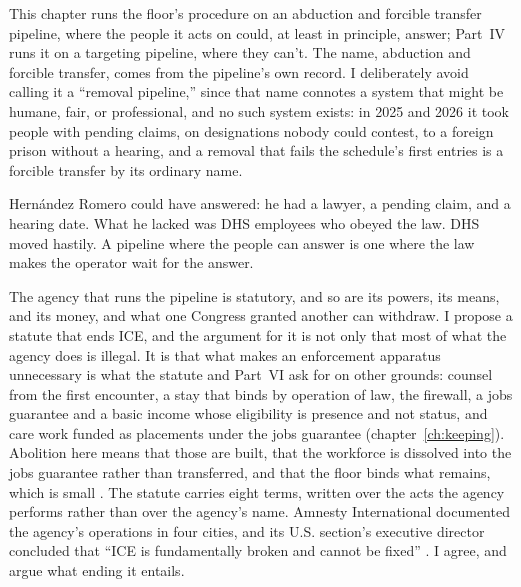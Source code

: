 This chapter runs the floor's procedure on an abduction and forcible transfer pipeline, where the people it acts on could, at least in principle, answer; Part~IV runs it on a targeting pipeline, where they can't. The name, abduction and forcible transfer, comes from the pipeline's own record. I deliberately avoid calling it a “removal pipeline,” since that name connotes a system that might be humane, fair, or professional, and no such system exists: in 2025 and 2026 it took people with pending claims, on designations nobody could contest, to a foreign prison without a hearing, and a removal that fails the schedule's first entries is a forcible transfer by its ordinary name.

Hernández Romero could have answered: he had a lawyer, a pending claim, and a hearing date. What he lacked was DHS employees who obeyed the law. DHS moved hastily.
A pipeline where the people can answer is one where the law makes the operator wait for the answer.

The agency that runs the pipeline is statutory, and so are its powers, its means, and its money, and what one Congress granted another can withdraw. I propose a statute that ends ICE, and the argument for it is not only that most of what the agency does is illegal. It is that what makes an enforcement apparatus unnecessary is what the statute and Part~VI ask for on other grounds: counsel from the first encounter, a stay that binds by operation of law, the firewall, a jobs guarantee and a basic income whose eligibility is presence and not status, and care work funded as placements under the jobs guarantee (chapter~\ref{ch:keeping}). Abolition here means that those are built, that the workforce is dissolved into the jobs guarantee rather than transferred, and that the floor binds what remains, which is small \autocite{gilmore2022abolition}. The statute carries eight terms, written over the acts the agency performs rather than over the agency's name.
Amnesty International documented the agency's operations in four cities, and its U.S. section's executive director concluded that “ICE is fundamentally broken and cannot be fixed” \autocite{Amnesty2026PressRelease}. I agree, and argue what ending it entails.
